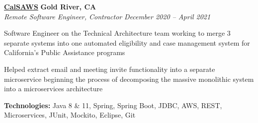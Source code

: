 %
    \headerrow
        {\textbf{\href{https://www.calsaws.org/}{CalSAWS}}}
        {\textbf{Gold River, CA}}
    \\
    \headerrow
        {\emph{Remote Software Engineer, Contractor}}
        {\emph{December 2020 -- April 2021}}
    \begin{itemize*}
        \item Software Engineer on the Technical Architecture team working to merge 3 separate systems into
            one automated eligibility and case management system for California's Public Assistance programs
        \item Helped extract email and meeting invite functionality into a separate microservice beginning the process of decomposing
            the massive monolithic system into a microservices architecture
    \end{itemize*}

    \hspace{1.0em}
        {\textbf{Technologies:} Java 8 \& 11, Spring, Spring Boot, JDBC, AWS, REST, Microservices, JUnit, Mockito, Eclipse, Git}

